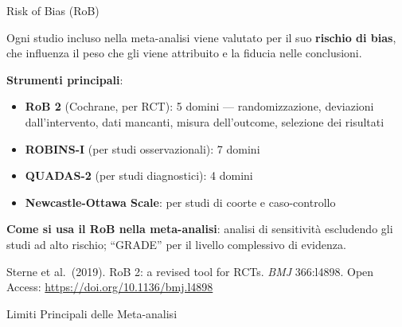 \documentclass[
  ignorenonframetext,
]{beamer}
\begin{document}
\begin{frame}{Risk of Bias (RoB)}
\label{risk-of-bias-rob}
\small

Ogni studio incluso nella meta-analisi viene valutato per il suo
\textbf{rischio di bias}, che influenza il peso che gli viene attribuito
e la fiducia nelle conclusioni.

\vspace{0.4em}

\textbf{Strumenti principali}:

\begin{itemize}\footnotesize
\item \textbf{RoB 2} (Cochrane, per RCT): 5 domini — randomizzazione, deviazioni dall'intervento, dati mancanti, misura dell'outcome, selezione dei risultati
\item \textbf{ROBINS-I} (per studi osservazionali): 7 domini
\item \textbf{QUADAS-2} (per studi diagnostici): 4 domini
\item \textbf{Newcastle-Ottawa Scale}: per studi di coorte e caso-controllo
\end{itemize}

\vspace{0.4em}

\textbf{Come si usa il RoB nella meta-analisi}: analisi di sensitività
escludendo gli studi ad alto rischio; ``GRADE'' per il livello
complessivo di evidenza.

\vspace{0.2em}

\tiny Sterne et al.~(2019). RoB 2: a revised tool for RCTs. \emph{BMJ}
366:l4898. Open Access: \url{https://doi.org/10.1136/bmj.l4898}
\end{frame}

\begin{frame}{Limiti Principali delle Meta-analisi}
\label{limiti-principali-delle-meta-analisi}


\begin{center}
\end{center}
\end{frame}
\end{document}
